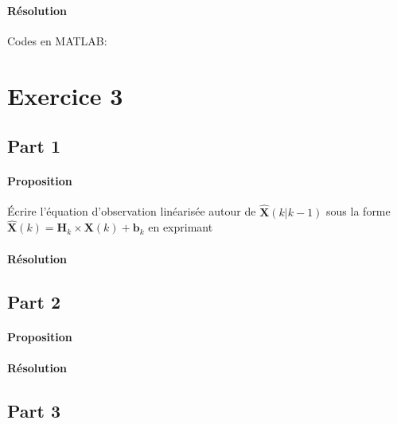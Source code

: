 \documentclass{article}
\begin{document}
\paragraph{Résolution}Codes en MATLAB:
\begin{scriptsize}\mycode
    
\end{scriptsize}

\begin{scriptsize}\mycode
    
\end{scriptsize}

\begin{scriptsize}\mycode
    
\end{scriptsize}


\section{Exercice 3}
\subsection{Part 1}
\paragraph{Proposition}Écrire l'équation d'observation linéarisée autour de $\hat{\mathbf{X}}(k | k-1)$ sous la forme $\hat{\mathbf{X}}(k) = \mathbf{H}_{k} \times \mathbf{X}(k) + \mathbf{b}_{k}$ en exprimant 

\paragraph{Résolution}


\subsection{Part 2}
\paragraph{Proposition}

\paragraph{Résolution}


\subsection{Part 3}
\end{document}
